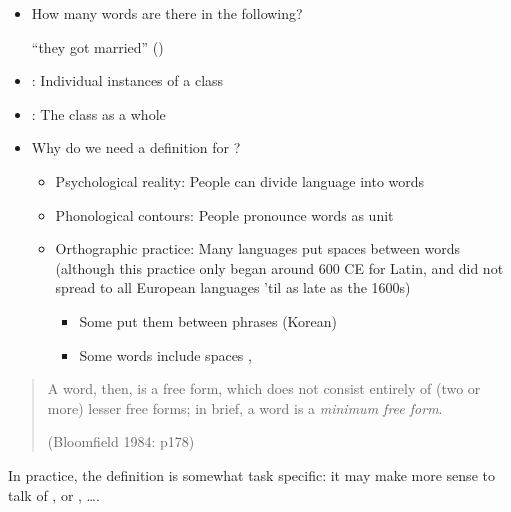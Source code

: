 \documentclass[a4paper,landscape,headrule,footrule,xetex]{foils}
\begin{document}

\begin{itemize}
\item How many words are there in the following?
  \begin{exe}
  \ex {}
  \ex {}
  \ex {}
  \ex {}
  \ex {}  ``they got married'' ()
\end{exe}  

\item {}: Individual instances of a class
\item {}: The class as a whole
\end{itemize}
\newpage
\begin{itemize}
\item  Why do we need a definition for ?
  \begin{itemize}
  \item Psychological reality:  People can divide language into words
  \item Phonological contours:  People pronounce words as unit
  \item Orthographic practice: Many languages put spaces between words
(although this practice only began around 600 CE for Latin, and did
not spread to all European languages 'til as late as the 1600s)
 \begin{itemize}
 \item Some put them between phrases (Korean)
 \item Some words include spaces , 
  \end{itemize}
\end{itemize}
\end{itemize}


\begin{quote}
A word, then, is a free form, which does not consist
entirely of (two or more) lesser free forms; in brief, a
word is a \textit{minimum free form}.
\begin{flushright}
  (Bloomfield 1984: p178) 
\end{flushright}
 \end{quote}

In practice, the definition is somewhat task specific: it may make more sense to talk of ,  or , \ldots .
\end{document}
